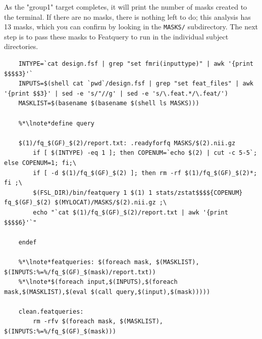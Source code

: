 As the "group1" target completes, it will print the number of masks created to the terminal. If there are no masks, there is nothing left to do; this analysis has 13 masks, which you can confirm by looking in the \texttt{MASKS/} subdirectory. The next step is to pass these masks to Featquery to run in the individual subject directories.

\begin{lstlisting}
	INTYPE=`cat design.fsf | grep "set fmri(inputtype)" | awk '{print $$$$3}'`
	INPUTS=$(shell cat `pwd`/design.fsf | grep "set feat_files" | awk '{print $$3}' | sed -e 's/"//g' | sed -e 's/\.feat.*/\.feat/')
	MASKLIST=$(basename $(basename $(shell ls MASKS)))
	
	%*\lnote*define query
	
	$(1)/fq_$(GF)_$(2)/report.txt: .readyforfq MASKS/$(2).nii.gz
		if [ $(INTYPE) -eq 1 ]; then COPENUM=`echo $(2) | cut -c 5-5`; else COPENUM=1; fi;\
		if [ -d $(1)/fq_$(GF)_$(2) ]; then rm -rf $(1)/fq_$(GF)_$(2)*; fi ;\
		$(FSL_DIR)/bin/featquery 1 $(1) 1 stats/zstat$$$${COPENUM} fq_$(GF)_$(2) $(MYLOCAT)/MASKS/$(2).nii.gz ;\
		echo "`cat $(1)/fq_$(GF)_$(2)/report.txt | awk '{print $$$$6}'`"
	
	endef
	
	%*\lnote*featqueries: $(foreach mask, $(MASKLIST), $(INPUTS:%=%/fq_$(GF)_$(mask)/report.txt))
	%*\lnote*$(foreach input,$(INPUTS),$(foreach mask,$(MASKLIST),$(eval $(call query,$(input),$(mask)))))
	
	clean.featqueries:
		rm -rfv $(foreach mask, $(MASKLIST), $(INPUTS:%=%/fq_$(GF)_$(mask)))
\end{lstlisting}

